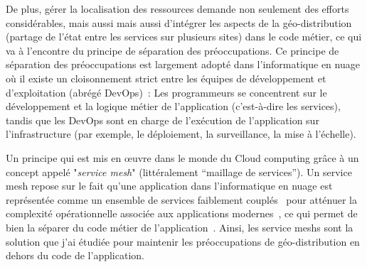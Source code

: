 


De plus, gérer la localisation des ressources demande non seulement
des efforts considérables, mais aussi mais aussi d'intégrer les
aspects de la géo-distribution (partage de l'état entre les services
sur plusieurs sites) dans le code métier, ce qui va à l'encontre du
principe de séparation des préoccupations.
%
Ce principe de séparation des préoccupations est largement adopté dans
l'informatique en nuage où il existe un cloisonnement strict entre les
équipes de développement et d'exploitation (abrégé
DevOps)~\cite{HKR13, LLGZG19}:
%
Les programmeurs se concentrent sur le développement et la logique
métier de l'application (c'est-à-dire les services), tandis que les
DevOps sont en charge de l'exécution de l'application sur
l'infrastructure (par exemple, le déploiement, la surveillance, la
mise à l'échelle).

Un principe qui est mis en œuvre dans le monde du Cloud computing
grâce à un concept appelé "\emph{service mesh}" (littéralement ``maillage de
services'').
%
Un service mesh repose sur le fait qu'une application dans
l'informatique en nuage est représentée comme un ensemble de services
faiblement couplés~\cite{GZCS+19} pour atténuer la complexité
opérationnelle associée aux applications modernes~\cite{LLGZG19}, ce
qui permet de bien la séparer du code métier de
l'application~\cite{SMmanifesto}.
%
Ainsi, les service meshs sont la solution que j'ai étudiée pour
maintenir les préoccupations de géo-distribution en dehors du code de
l'application.



